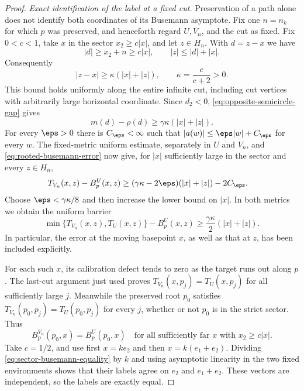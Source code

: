 \begin{proof}
\emph{Exact identification of the label at a fixed cut.}
Preservation of a path alone does not identify both coordinates of
its Busemann asymptote.  Fix one $n=n_k$ for which $p$ was preserved,
and henceforth regard $U,V_n$, and the cut as fixed.  Fix $0<c<1$,
take $x$ in the sector $x_2\ge c|x|$, and let $z\in H_n$.  With
$d=z-x$ we have
\[
 |d|\ge x_2+n\ge c|x|,
 \qquad |z|\le|d|+|x|.
\]
Consequently
\begin{equation}
 |z-x|\ge\kappa(|x|+|z|),\qquad
 \kappa=\frac{c}{c+2}>0.
 \label{eq:fixed-cut-comparability}
\end{equation}
This bound holds uniformly along the entire infinite cut, including
cut vertices with arbitrarily large horizontal coordinate.  Since
$d_2<0$, \eqref{eq:opposite-semicircle-gap} gives
\[
 m(d)-\rho(d)\ge\gamma\kappa(|x|+|z|).
\]
For every $\eps>0$ there is $C_\eps<\infty$ such that
$|a(w)|\le\eps|w|+C_\eps$ for every $w$.  The fixed-metric uniform
estimate, separately in $U$ and $V_n$, and
\eqref{eq:rooted-busemann-error} now give, for $|x|$ sufficiently
large in the sector and every $z\in H_n$,
\begin{align*}
 T_{V_n}(x,z)-B_p^U(x,z)
 &\ge (\gamma\kappa-2\eps)(|x|+|z|)-2C_\eps.
\end{align*}
Choose $\eps<\gamma\kappa/8$ and then increase the lower bound on
$|x|$.  In both metrics we obtain the uniform barrier
\begin{equation}
 \min\{T_{V_n}(x,z),T_U(x,z)\}-B_p^U(x,z)
 \ge\frac{\gamma\kappa}{2}(|x|+|z|).
 \label{eq:fixed-cut-positive-barrier}
\end{equation}
In particular, the error at the moving basepoint $x$, as well as
that at $z$, has been included explicitly.

For each such $x$, its calibration defect tends to zero as the
target runs out along $p$.  The last-cut argument just used proves
$T_{V_n}(x,p_j)=T_U(x,p_j)$ for all sufficiently large $j$.
Meanwhile the preserved root $p_0$ satisfies
$T_{V_n}(p_0,p_j)=T_U(p_0,p_j)$ for every $j$, whether or not $p_0$
is in the strict sector.  Thus
\begin{equation}
 B_p^{V_n}(p_0,x)=B_p^U(p_0,x)
 \quad\text{for all sufficiently far }x\text{ with }x_2\ge c|x|.
 \label{eq:sector-busemann-equality}
\end{equation}
Take $c=1/2$, and use first $x=ke_2$ and then
$x=k(e_1+e_2)$.  Dividing \eqref{eq:sector-busemann-equality} by $k$
and using asymptotic linearity in the two fixed environments shows
that their labels agree on $e_2$ and $e_1+e_2$.  These vectors are
independent, so the labels are exactly equal.


\end{proof}
